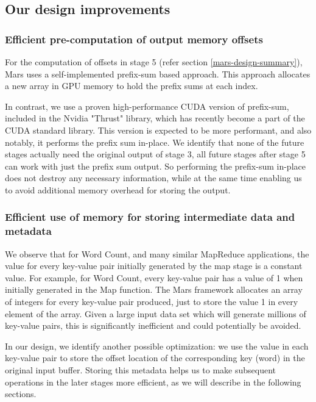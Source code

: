 \documentclass{article}
\begin{document}
\subsection{Our design improvements}
\subsubsection{Efficient pre-computation of output memory offsets}
For the computation of offsets in stage 5 (refer section \ref{mars-design-summary}), Mars uses a self-implemented prefix-sum based approach. This approach allocates a new array in GPU memory to hold the prefix sums at each index.

In contrast, we use a proven high-performance CUDA version of prefix-sum, included in the Nvidia "Thrust" library, which has recently become a part of the CUDA standard library. This version is expected to be more performant, and also notably, it performs the prefix sum in-place. We identify that none of the future stages actually need the original output of stage 3, all future stages after stage 5 can work with just the prefix sum output. So performing the prefix-sum in-place does not destroy any necessary information, while at the same time enabling us to avoid additional memory overhead for storing the output.

\subsubsection{Efficient use of memory for storing intermediate data and metadata} \label{efficient-metadata}
We observe that for Word Count, and many similar MapReduce applications, the value for every key-value pair initially generated by the map stage is a constant value. For example, for Word Count, every key-value pair has a value of 1 when initially generated in the Map function. The Mars framework allocates an array of integers for every key-value pair produced, just to store the value 1 in every element of the array. Given a large input data set which will generate millions of key-value pairs, this is significantly inefficient and could potentially be avoided. 

In our design, we identify another possible optimization: we use the value in each key-value pair to store the offset location of the corresponding key (word) in the original input buffer. Storing this metadata helps us to make subsequent operations in the later stages more efficient, as we will describe in the following sections. 
\end{document}
